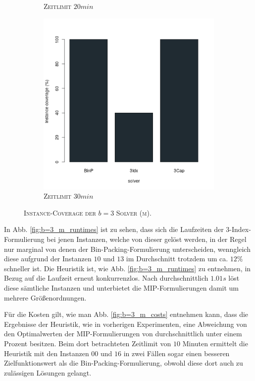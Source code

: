 \begin{figure}[H]
\begin{subfigure}[b]{0.3\textwidth}
\caption{\textsc{Zeitlimit} $20min$}
\label{fig:instance_coverage_b=3_m_b}
\end{subfigure}
\hfill
\begin{subfigure}[b]{0.3\textwidth}
\centering
\includegraphics[width=1.2\textwidth]{img/solver_instance_coverage_b=3_m_1800s.png}
\caption{\textsc{Zeitlimit} $30min$}
\label{fig:instance_coverage_b=3_m_c}
\end{subfigure}
\caption{\textsc{Instance-Coverage der $b = 3$ Solver (m)}.}
\label{fig:instance_coverage_b=3_m}
\end{figure}

In Abb. \ref{fig:b=3_m_runtimes} ist zu sehen, dass sich die Laufzeiten der 3-Index-Formulierung bei jenen Instanzen,
welche von dieser gelöst werden, in der Regel nur marginal von denen der Bin-Packing-Formulierung unterscheiden,
wenngleich diese aufgrund der Instanzen $10$ und $13$ im Durchschnitt trotzdem um ca. $12 \%$ schneller ist.\newline
Die Heuristik ist, wie Abb. \ref{fig:b=3_m_runtimes} zu entnehmen, in Bezug auf die Laufzeit erneut konkurrenzlos.
Nach durchschnittlich $1.01s$ löst diese sämtliche Instanzen und unterbietet die MIP-Formulierungen damit um mehrere Größenordnungen.

Für die Kosten gilt, wie man Abb. \ref{fig:b=3_m_costs} entnehmen kann, dass die Ergebnisse der Heuristik,
wie in vorherigen Experimenten, eine Abweichung von den Optimalwerten der MIP-Formulierungen von durchschnittlich
unter einem Prozent besitzen. Beim dort betrachteten Zeitlimit von $10$ Minuten ermittelt die Heuristik mit den
Instanzen $00$ und $16$ in zwei Fällen sogar einen besseren Zielfunktionswert als die Bin-Packing-Formulierung,
obwohl diese dort auch zu zulässigen Lösungen gelangt.

